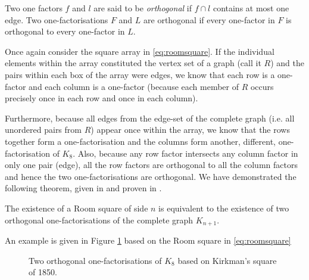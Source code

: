 Two one factors $f$ and $l$ are said to be \emph{orthogonal} if $f \cap l$ contains at most one edge.
Two one-factorisations $F$ and $L$ are orthogonal if every one-factor in $F$ is orthogonal to every one-factor in $L$.

Once again consider the square array in \eqref{eq:roomsquare}.
If the individual elements within the array constituted the vertex set of a graph (call it $R$) and the pairs within each box of the array were edges, we know that each row is a one-factor and each column is a one-factor (because each member of $R$ occurs precisely once in each row and once in each column).

Furthermore, because all edges from the edge-set of the complete graph (i.e. all unordered pairs from $R$) appear once within the array, we know that the rows together form a one-factorisation and the columns form another, different, one-factorisation of $K_8$.
Also, because any row factor intersects any column factor in only one pair (edge), all the row factors are orthogonal to all the column factors and hence the two one-factorisations are orthogonal.
We have demonstrated the following theorem, given in
\cite{dinitzContemporaryDesignTheory1992}
and proven in
\cite{nemethStudyRoomSquares1969}.

\begin{theorem}
The existence of a Room square of side $n$ is equivalent to the existence of two orthogonal one-factorisations of the complete graph $K_{n+1}$.
\end{theorem}

An example is given in Figure \ref{fig:kirkmans-square} based on the Room square in \eqref{eq:roomsquare}

\begin{figure}
  \centering
  
  \caption{Two orthogonal one-factorisations of $K_{8}$ based on Kirkman's square of 1850.}
  \label{fig:kirkmans-square}
\end{figure}
